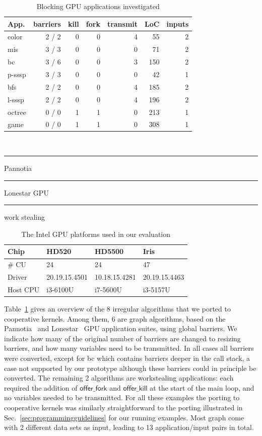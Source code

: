 \documentclass[numbers,nocopyrightspace,10pt]{sigplanconf}
\newcommand\crule[3][black]{\textcolor{#1}{\rule{#2}{#3}}}
\newcommand{\mytablong}{Table~}
\newcommand{\mysec}{Sec.~}
\newcommand{\offerfork}{\mathsf{offer\_fork}}
\newcommand{\offerkill}{\mathsf{offer\_kill}}
\begin{document}
\begin{table}[t]
\small
\centering
\begin{tabular}{ l r r r r r r}
App. & barriers & kill & fork & transmit & LoC & inputs\\
\hline
\rowcolor{Gray1}
color & 2 / 2 & 0 & 0 & 4 & 55 & 2\\
\rowcolor{Gray1}
mis & 3 / 3 & 0 & 0 & 0 & 71 & 2\\
\rowcolor{Gray1}
bc & 3 / 6 & 0 & 0 & 3 & 150 & 2\\
\rowcolor{Gray1}
p-sssp & 3 / 3 & 0 & 0 & 0  & 42 & 1\\
\rowcolor{Gray2}
bfs & 2 / 2 & 0 & 0  & 4  & 185 & 2\\
\rowcolor{Gray2}
l-sssp & 2 / 2 & 0 & 0  & 4  & 196 & 2\\
\rowcolor{Gray3}
octree & 0 / 0 & 1 & 1 & 0 & 213 & 1 \\
\rowcolor{Gray3}
game & 0 / 0 & 1 & 1 & 0 & 308 & 1 \\
\end{tabular} \\
\vspace{.2cm}
\crule[Gray1]{.2cm}{.2cm} Pannotia \hspace{.4cm} \crule[Gray2]{.2cm}{.2cm} Lonestar GPU  \hspace{.4cm}  \crule[Gray3]{.2cm}{.2cm} work stealing
\caption{Blocking GPU applications investigated}
\label{tab:applications}
\end{table}

\begin{table}[h]
\footnotesize
\centering
\begin{tabular}{ l l l l }
Chip & HD520 & HD5500 & Iris\\
\hline
\# CU  & 24 & 24 & 47 \\
Driver   & 20.19.15.4501 & 10.18.15.4281 & 20.19.15.4463 \\
Host CPU & i3-6100U & i7-5600U & i3-5157U \\
\end{tabular}
\caption{The Intel GPU platforms used in our evaluation}
\label{tab:chipstested}
\end{table}

\mytablong\ref{tab:applications} gives an overview of the 8 irregular
algorithms that we ported to cooperative kernels. Among them, 6 are
graph algorithms, based on the Pannotia~\cite{Pannotia} and
Lonestar~\cite{BNP12} GPU application suites, using global barriers.  We
indicate how many of the original number of barriers are changed to
resizing barriers, and how many variables need to be transmitted.  In
all cases all barriers were converted, except for bc which contains
barriers deeper in the call stack, a case not supported by our
prototype although these barriers could in principle be
converted. The remaining 2 algorithms are workstealing applications:
each required the addition of $\offerfork$ and $\offerkill$ at the start
of the main loop, and no variables needed to be transmitted.  For all
these examples the porting to cooperative kernels was similarly
straightforward to the porting illustrated in
\mysec\ref{sec:programmingguidelines} for our running examples. Most graph come with 2
different data sets as input, leading to 13 application/input pairs in
total.
\end{document}
